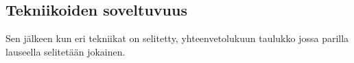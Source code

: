 \documentclass[finnish,gradu]{tktltiki}
\begin{document}



  \subsection{Tekniikoiden soveltuvuus} %
  \label{sub:tekniikoiden_yhtäläisyydet}

  Sen jälkeen kun eri tekniikat on selitetty, yhteenvetolukuun taulukko jossa parilla lauseella selitetään jokainen.







\end{document}
